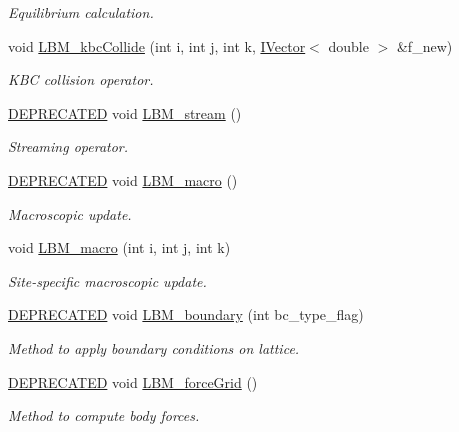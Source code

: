 \begin{DoxyCompactItemize}
\begin{DoxyCompactList}\small\item\em Equilibrium calculation. \end{DoxyCompactList}\item 
void \hyperlink{class_grid_obj_ac4ca0327a53171fe8e1c3076e9f1353f}{L\+B\+M\+\_\+kbc\+Collide} (int i, int j, int k, \hyperlink{class_i_vector}{I\+Vector}$<$ double $>$ \&f\+\_\+new)
\begin{DoxyCompactList}\small\item\em K\+BC collision operator. \end{DoxyCompactList}\item 
\hyperlink{stdafx_8h_ac1e8a42306d8e67cb94ca31c3956ee78}{D\+E\+P\+R\+E\+C\+A\+T\+ED} void \hyperlink{class_grid_obj_a5b5cb1f3136da8cbff96955d9c6d9e5b}{L\+B\+M\+\_\+stream} ()
\begin{DoxyCompactList}\small\item\em Streaming operator. \end{DoxyCompactList}\item 
\hyperlink{stdafx_8h_ac1e8a42306d8e67cb94ca31c3956ee78}{D\+E\+P\+R\+E\+C\+A\+T\+ED} void \hyperlink{class_grid_obj_a25382158b7747da7c0639aed513ae39c}{L\+B\+M\+\_\+macro} ()
\begin{DoxyCompactList}\small\item\em Macroscopic update. \end{DoxyCompactList}\item 
void \hyperlink{class_grid_obj_ab69942450175d12c75f4b8d33b06c905}{L\+B\+M\+\_\+macro} (int i, int j, int k)
\begin{DoxyCompactList}\small\item\em Site-\/specific macroscopic update. \end{DoxyCompactList}\item 
\hyperlink{stdafx_8h_ac1e8a42306d8e67cb94ca31c3956ee78}{D\+E\+P\+R\+E\+C\+A\+T\+ED} void \hyperlink{class_grid_obj_a23d89d6111dd46653b2b1f79a5c7fbf1}{L\+B\+M\+\_\+boundary} (int bc\+\_\+type\+\_\+flag)
\begin{DoxyCompactList}\small\item\em Method to apply boundary conditions on lattice. \end{DoxyCompactList}\item 
\hyperlink{stdafx_8h_ac1e8a42306d8e67cb94ca31c3956ee78}{D\+E\+P\+R\+E\+C\+A\+T\+ED} void \hyperlink{class_grid_obj_a38db857b219d13ca7b0d35ede87b1536}{L\+B\+M\+\_\+force\+Grid} ()
\begin{DoxyCompactList}\small\item\em Method to compute body forces. \end{DoxyCompactList}\item 

\end{DoxyCompactItemize}
